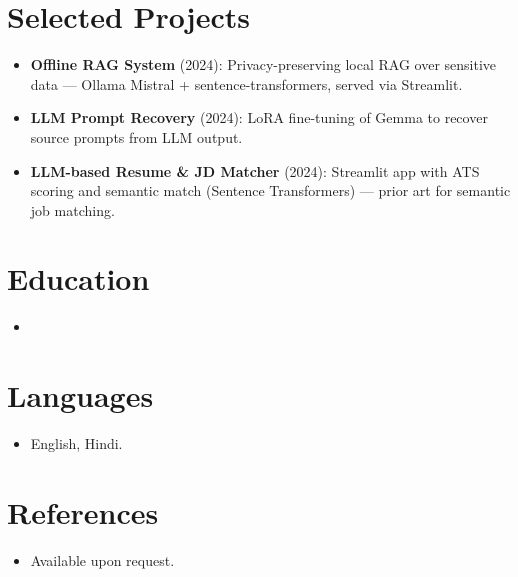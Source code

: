 \documentclass[11pt,a4paper,sans]{moderncv}
\begin{document}
\section{Selected Projects}
\vspace{1pt}
\begin{itemize}
\item \textbf{Offline RAG System} (2024): Privacy-preserving local RAG over sensitive data --- Ollama Mistral + sentence-transformers, served via Streamlit.
\item \textbf{LLM Prompt Recovery} (2024): LoRA fine-tuning of Gemma to recover source prompts from LLM output.
\item \textbf{LLM-based Resume \& JD Matcher} (2024): Streamlit app with ATS scoring and semantic match (Sentence Transformers) --- prior art for semantic job matching.
\end{itemize}


\section{Education}
\vspace{1pt}
\begin{itemize}

\item{}

\end{itemize}


\section{Languages}
\vspace{1pt}
\begin{itemize}
\item English, Hindi.
\end{itemize}


\section{References}
\vspace{1pt}
\begin{itemize}
\item{Available upon request.}
\end{itemize}
\end{document}

